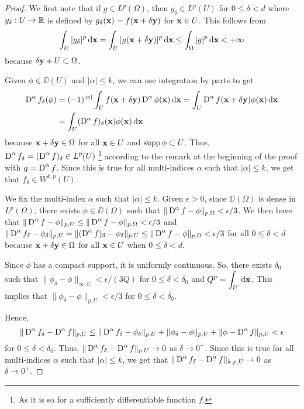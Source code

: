 \begin{proof}
We first note that if $\displaystyle g \in L^p(\Omega)$, then
$\displaystyle g_\delta \in L^p(U)$ for $0 \leq \delta <d$ where
$g_\delta:U \to \mathbb{R}$ is defined by
$g_\delta(\mathbf{x}) = f(\mathbf{x} + \delta \mathbf{y})$
for $\mathbf{x} \in U$.  This follows from
\[
\int_U |g_\delta|^p \,\mathrm{d}{\mathbf{x}}
= \int_U |g(\mathbf{x} + \delta\mathbf{y})|^p \,\mathrm{d}{\mathbf{x}}
\leq \int_{\Omega} |g|^p \,\mathrm{d}{\mathbf{x}} < +\infty
\]
because $\delta \mathbf{y} + U \subset \Omega$.

Given $\phi \in \DD(U)$ and $|\alpha| \leq k$, we can use integration by
parts to get
\begin{align*}
\operatorname{D}^\alpha f_\delta (\phi)
&= (-1)^{|\alpha|} \int_U f(\mathbf{x}+\delta\mathbf{y})
\operatorname{D}^\alpha \phi(\mathbf{x}) \,\mathrm{d}{\mathbf{x}}
= \int_U \operatorname{D}^\alpha f(\mathbf{x}+\delta\mathbf{y}) \phi(\mathbf{x}) \,\mathrm{d}{\mathbf{x}} \\
&= \int_U (\operatorname{D}^\alpha f)_\delta(\mathbf{x}) \phi(\mathbf{x}) \,\mathrm{d}{\mathbf{x}}
\end{align*}
because $\mathbf{x}+\delta\mathbf{y} \in \Omega$ for all $\mathbf{x} \in U$
and $\operatorname{supp} \phi \subset U$.  Thus, 
$\displaystyle \operatorname{D}^\alpha f_\delta = (\operatorname{D}^\alpha f)_\delta \in L^p(U)$
\footnote{As it is so for a sufficiently differentiable function $f$.}
according to the remark at the beginning of the proof with
$\displaystyle g = \operatorname{D}^\alpha f$.  Since this is true for all
multi-indices $\alpha$ such that $|\alpha|\leq k$, we get that
$\displaystyle f_\delta \in W^{k,p}(U)$.

We fix the multi-index $\alpha$ such that $|\alpha|\leq k$.
Given $\epsilon >0$, since $\DD(\Omega)$ is dense in
$\displaystyle L^p(\Omega)$, there exists $\phi \in \DD(\Omega)$
such that $\displaystyle \|\operatorname{D}^\alpha f - \phi\|_{p,\Omega} < \epsilon/3$.
We then have that
$\displaystyle \|\operatorname{D}^\alpha f - \phi\|_{p,U} \leq
\|\operatorname{D}^\alpha f - \phi\|_{p,\Omega} < \epsilon/3$
and
$\displaystyle \|\operatorname{D}^\alpha f_\delta - \phi_\delta \|_{p,U}
= \| (\operatorname{D}^\alpha f)_\delta - \phi_\delta \|_{p,U}
\leq \|\operatorname{D}^\alpha f - \phi\|_{p,\Omega} < \epsilon/3$
for all $0\leq \delta < d$
because $\mathbf{x}+\delta\mathbf{y} \in \Omega$ for all $\mathbf{x} \in U$
when $0\leq \delta < d$.

Since $\phi$ has a compact support, it is uniformly continuous.
So, there exists $\delta_0$ such that
$\| \phi_\delta - \phi\|_{\infty,U} < \epsilon/(3Q)$
for $0 \leq \delta < \delta_0$ and
$\displaystyle Q^p = \int_U \,\mathrm{d}{\mathbf{x}}$.  This implies that
$\| \phi_\delta - \phi\|_{p,U} < \epsilon/3$ for $0\leq \delta < \delta_0$.

Hence,
\[
\|\operatorname{D}^\alpha f_\delta - \operatorname{D}^\alpha f \|_{p,U} \leq
\|\operatorname{D}^\alpha f_\delta - \phi_\delta \|_{p,U}
+ \| \phi_\delta - \phi\|_{p,U} 
+ \| \phi - \operatorname{D}^\alpha f\|_{p,U} < \epsilon
\]
for $0\leq \delta < \delta_0$.  Thus,
$\displaystyle \|\operatorname{D}^\alpha f_\delta - \operatorname{D}^\alpha f \|_{p,U} \to 0$ as
$\delta \to 0^+$.  Since this is true for all multi-indices $\alpha$ such
that $|\alpha|\leq k$, we get that
$\displaystyle \|\operatorname{D}^\alpha f_\delta - \operatorname{D}^\alpha f \|_{k,p,U} \to 0$ as
$\delta \to 0^+$.
\end{proof}

